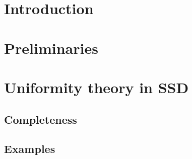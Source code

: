 \documentclass{../util/zariski}
\begin{document}
\tableofcontents

\section{Introduction}
%
\section{Preliminaries}


%
\section{Uniformity theory in SSD}

\subsection{Completeness}

\subsection{Examples}


%
%
\appendix

\printbibliography
%
\end{document}
